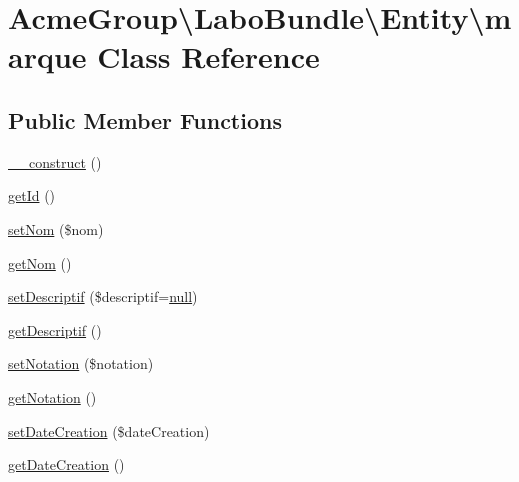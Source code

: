 \hypertarget{class_acme_group_1_1_labo_bundle_1_1_entity_1_1marque}{\section{Acme\+Group\textbackslash{}Labo\+Bundle\textbackslash{}Entity\textbackslash{}marque Class Reference}
\label{class_acme_group_1_1_labo_bundle_1_1_entity_1_1marque}
}
\subsection*{Public Member Functions}
\begin{DoxyCompactItemize}
\item 
\hyperlink{class_acme_group_1_1_labo_bundle_1_1_entity_1_1marque_a9858dbd227bc86386972caa7c320e99e}{\+\_\+\+\_\+construct} ()
\item 
\hyperlink{class_acme_group_1_1_labo_bundle_1_1_entity_1_1marque_af70eaf2d9ccd4cf191ef021f034ca16d}{get\+Id} ()
\item 
\hyperlink{class_acme_group_1_1_labo_bundle_1_1_entity_1_1marque_ab49f0669a923a923c094e7648fa474a5}{set\+Nom} (\$nom)
\item 
\hyperlink{class_acme_group_1_1_labo_bundle_1_1_entity_1_1marque_acbca38cdfa009783631e5f800fabef18}{get\+Nom} ()
\item 
\hyperlink{class_acme_group_1_1_labo_bundle_1_1_entity_1_1marque_ae73b1c672764ec136b78901cbf8a8ab8}{set\+Descriptif} (\$descriptif=\hyperlink{validate_8js_afb8e110345c45e74478894341ab6b28e}{null})
\item 
\hyperlink{class_acme_group_1_1_labo_bundle_1_1_entity_1_1marque_a71957f1b51fd50065af365713c269fc6}{get\+Descriptif} ()
\item 
\hyperlink{class_acme_group_1_1_labo_bundle_1_1_entity_1_1marque_aebbf40cb77ef06bc575f0adc35612ed2}{set\+Notation} (\$notation)
\item 
\hyperlink{class_acme_group_1_1_labo_bundle_1_1_entity_1_1marque_a8bf7e7e41d362a0e380bd8fee1d2a952}{get\+Notation} ()
\item 
\hyperlink{class_acme_group_1_1_labo_bundle_1_1_entity_1_1marque_a26618f545d6f9b0dd16bdb170d59d047}{set\+Date\+Creation} (\$date\+Creation)
\item 
\hyperlink{class_acme_group_1_1_labo_bundle_1_1_entity_1_1marque_a5593a50ff2087bf056e874e81e8ea930}{get\+Date\+Creation} ()

\end{DoxyCompactItemize}
